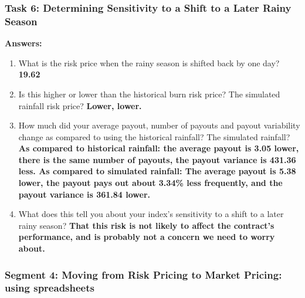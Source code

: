 \documentclass[letterpaper,10pt,english]{sphinxmanual}
\begin{document}
\subsubsection{Task 6: Determining Sensitivity to a Shift to a Later Rainy Season}
\label{wiiet/wiiet_initialtomarketpricinganskey:task-6-determining-sensitivity-to-a-shift-to-a-later-rainy-season}
\textbf{Answers:}
\begin{enumerate}
\item {} 
What is the risk price when the rainy season is shifted back by one day? \textbf{19.62}

\item {} 
Is this higher or lower than the historical burn risk price? The simulated rainfall risk price? \textbf{Lower, lower.}

\item {} 
How much did your average payout, number of payouts and payout variability change as compared to using the historical rainfall?  The simulated rainfall? \textbf{As compared to historical rainfall: the average payout is 3.05 lower, there is the same number of payouts, the payout variance is 431.36 less. As compared to simulated rainfall: The average payout is 5.38 lower, the payout pays out about 3.34\% less frequently, and the payout variance is 361.84 lower.}

\item {} 
What does this tell you about your index's sensitivity to a shift to a later rainy season? \textbf{That this risk is not likely to affect the contract's performance, and is probably not a concern we need to worry about.}

\end{enumerate}


\subsubsection{Segment 4: Moving from Risk Pricing to Market Pricing: using spreadsheets}
\label{wiiet/wiiet_initialtomarketpricinganskey:segment-4-moving-from-risk-pricing-to-market-pricing-using-spreadsheets}
\end{document}
